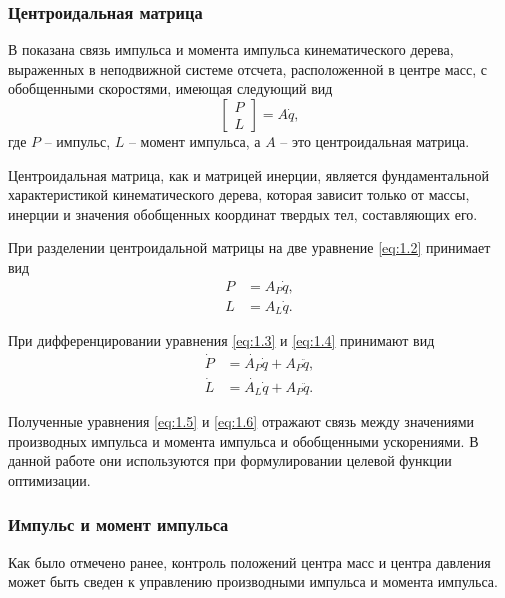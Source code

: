 \subsubsection{Центроидальная матрица}

В \cite{OrinG} показана связь импульса и момента импульса кинематического дерева, выраженных в неподвижной системе отсчета, расположенной в центре масс, с обобщенными скоростями, имеющая следующий вид
\begin{equation*}
\begin{bmatrix} P\\ L \end{bmatrix} = A \dot{q}, \tag{1.2}\label{eq:1.2}
\end{equation*}
где $P$ -- импульс, $L$ -- момент импульса, а $A$ -- это центроидальная матрица.

Центроидальная матрица, как и матрицей инерции, является фундаментальной характеристикой кинематического дерева, которая зависит только от массы, инерции и значения обобщенных координат твердых тел, составляющих его.

При разделении центроидальной матрицы на две уравнение \ref{eq:1.2} принимает вид
\begin{align*}
  P &= A_{P} \dot{q}, \tag{1.3}\label{eq:1.3} \\
  L &= A_{L} \dot{q}. \tag{1.4}\label{eq:1.4}
\end{align*}

При дифференцировании уравнения \ref{eq:1.3} и \ref{eq:1.4} принимают вид
\begin{align*}
  \dot{P} &= \dot{A_{P}} \dot{q} + A_{P} \ddot{q}, \tag{1.5}\label{eq:1.5} \\
  \dot{L} &= \dot{A_{L}} \dot{q} + A_{P} \ddot{q}. \tag{1.6}\label{eq:1.6}
\end{align*}

Полученные уравнения \ref{eq:1.5} и \ref{eq:1.6} отражают связь между значениями производных импульса и момента импульса и обобщенными ускорениями. В данной работе они используются при формулировании целевой функции оптимизации.

\subsubsection{Импульс и момент импульса}

Как было отмечено ранее, контроль положений центра масс и центра давления может быть сведен к управлению производными импульса и момента импульса.


